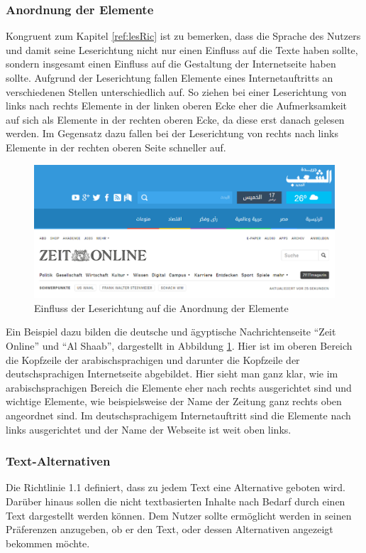 \documentclass[12pt, paper=a4, bibtotoc, toc=listof, headsepline=true]{scrreprt}
\begin{document}
			\subsubsection{Anordnung der Elemente}
			Kongruent zum Kapitel \ref{ref:lesRic} ist zu bemerken, dass die Sprache des Nutzers und damit seine Leserichtung nicht nur einen Einfluss auf die Texte haben sollte, sondern insgesamt einen Einfluss auf die Gestaltung der Internetseite haben sollte. Aufgrund der Leserichtung fallen Elemente eines Internetauftritts an verschiedenen Stellen unterschiedlich auf. So ziehen bei einer Leserichtung von links nach rechts Elemente in der linken oberen Ecke eher die Aufmerksamkeit auf sich als Elemente in der rechten oberen Ecke, da diese erst danach gelesen werden. Im Gegensatz dazu fallen bei der Leserichtung von rechts nach links Elemente in der rechten oberen Seite schneller auf.\cite[vgl. S.47 f.]{meidl2013global}
			\begin{figure}
				\centering
				\includegraphics[width=\textwidth,height=\textheight,keepaspectratio]{leserichtung.png}
				\caption{Einfluss der Leserichtung auf die Anordnung der Elemente\cite{elShaab}\cite{zeitOnline}}
				\label{img:lesRic}
			\end{figure}
			Ein Beispiel dazu bilden die deutsche und ägyptische Nachrichtenseite \enquote{Zeit Online} und \enquote{Al Shaab}, dargestellt in Abbildung  \ref{img:lesRic}. Hier ist im oberen Bereich die Kopfzeile der arabischsprachigen und darunter die Kopfzeile der deutschsprachigen Internetseite abgebildet. Hier sieht man ganz klar, wie im arabischsprachigen Bereich die Elemente eher nach rechts ausgerichtet sind und wichtige Elemente, wie beispielsweise der Name der Zeitung ganz rechts oben angeordnet sind. Im deutschsprachigem Internetauftritt sind die Elemente nach links ausgerichtet und der Name der Webseite ist weit oben links.
			\subsubsection{Text-Alternativen}
			Die Richtlinie 1.1 definiert, dass zu jedem Text eine Alternative geboten wird. Darüber hinaus sollen die nicht textbasierten Inhalte nach Bedarf durch einen Text dargestellt werden können. Dem Nutzer sollte ermöglicht werden in seinen Präferenzen anzugeben, ob er den Text, oder dessen Alternativen angezeigt bekommen möchte.
\end{document}
